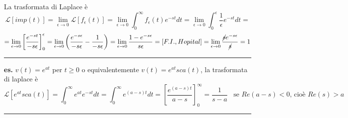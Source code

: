 La trasformata di Laplace è
\[
    \mathcal{L}[imp(t)] = \lim_{\epsilon\rightarrow 0} \mathcal{L}[f_\epsilon(t)] = \lim_{\epsilon\rightarrow 0}\int_{0}^{\infty}f_\epsilon (t) e^{-st} dt = \lim_{\epsilon\rightarrow 0}\int_{0}^{\epsilon}\frac{1}{\epsilon}e^{-st}dt =
\]
\[
    = \lim_{\epsilon\rightarrow 0}\left[\frac{e^{-st}}{-s\epsilon}\right]_0^\epsilon = \lim_{\epsilon\rightarrow 0}\left( \frac{e^{-s\epsilon}}{-s\epsilon}- \frac{1}{-s\epsilon} \right) = \lim_{\epsilon\rightarrow 0} \frac{1- e^{-s \epsilon}}{s\epsilon} = [F.I., Hopital] = \lim_{\epsilon\rightarrow 0}\frac{\cancel{s}e^{-s\epsilon}}{\cancel{s}} = 1
\]
\rule{\textwidth}{0,4pt}\newline
\newline
\textbf{es.} $v(t) = e^{at}$ per $t\geq 0$ o equivalentemente $v(t) = e^{at} sca(t)$, la trasformata di laplace è
\[
    \mathcal{L}[e^{at} sca(t)] = \int_{0}^{\infty}e^{at}e^{-st}dt = \int_{0}^{\infty}e^{(a-s)t}dt = \left[\frac{e^{(a-s)t}}{a-s}\right]_0^\infty = \frac{1}{s-a} \;\;\;\text{se $Re(a-s)<0$, cioè $Re(s)>a$}\;
\]
\rule{\textwidth}{0,4pt}
